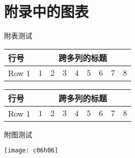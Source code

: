 \chapter{附录中的图表}{
\setcounter{app_fig}{1}
\setcounter{app_tab}{1}


附表测试

\begin{apptab}[!htbp]
    \label{apptab:1}
    \centering
    \footnotesize%
    \setlength{\tabcolsep}{4pt}%
    \renewcommand{\arraystretch}{1.2}%
    \begin{tabular}{lcccccccc}
        \hline
        行号 & \multicolumn{8}{c}{跨多列的标题}\\
        \hline
        Row 1 & $1$ & $2$ & $3$ & $4$ & $5$ & $6$ & $7$ & $8$\\
        \hline
    \end{tabular}
\end{apptab}


\begin{apptab}[!htbp]
    \label{apptab:2}
    \centering
    \footnotesize%
    \setlength{\tabcolsep}{4pt}%
    \renewcommand{\arraystretch}{1.2}%
    \begin{tabular}{lcccccccc}
        \hline
        行号 & \multicolumn{8}{c}{跨多列的标题}\\
        \hline
        Row 1 & $1$ & $2$ & $3$ & $4$ & $5$ & $6$ & $7$ & $8$\\
        \hline
    \end{tabular}
\end{apptab}

附图测试

\begin{appfig}[!htbp]
    \centering
    \texttt{[image: c06h06]}
    
    \label{appfig:1}
\end{appfig}

    
}
